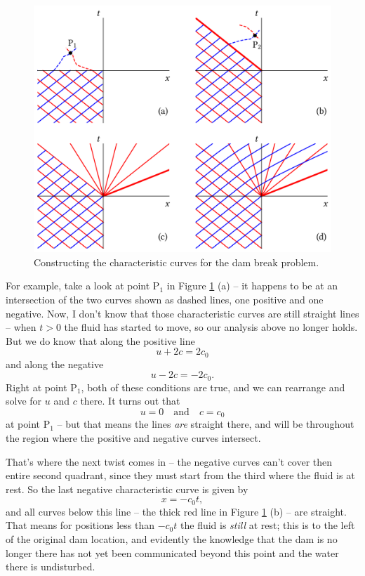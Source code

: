\begin{figure}
\centering
\includegraphics[width=\linewidth]{Figures/Chapter6/fig_char_curves}
\caption{Constructing the characteristic curves for the dam break problem. }
\label{fig_char_curves}
\end{figure}

For example, take a look at point P$_1$ in Figure \ref{fig_char_curves} (a) -- it happens to be at an intersection of the two curves shown as dashed lines, one positive and one negative.  Now, I don't know that those characteristic curves are still straight lines -- when $t>0$ the fluid has started to move, so our analysis above no longer holds.  But we do know that along the positive line 
\[
u + 2c = 2c_0
\]
and along the negative
\[
u - 2c = -2c_0.
\]
Right at point P$_1$, both of these conditions are true, and we can rearrange and solve for $u$ and $c$ there.  It turns out that
\[
u = 0 \quad \text{and} \quad c = c_0
\]
at point P$_1$ -- but that means the lines \emph{are} straight there, and will be throughout the region where the positive and negative curves intersect.

That's where the next twist comes in -- the negative curves can't cover then entire second quadrant, since they must start from the third where the fluid is at rest.  So the last negative characteristic curve is given by
\[
x = -c_0 t,
\]
and all curves below this line -- the thick red line in Figure \ref{fig_char_curves} (b) -- are straight.  That means for positions less than $-c_0 t$ the fluid is \emph{still} at rest; this is to the left of the original dam location, and evidently the knowledge that the dam is no longer there has not yet been communicated beyond this point and the water there is undisturbed.

